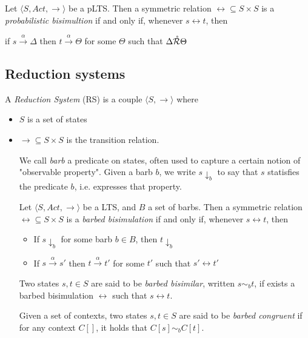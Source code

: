 Let $\langle S , Act, \rightarrow \rangle$ be a pLTS. Then a symmetric relation $\rel \subseteq S \times S$ is a \textit{probabilistic bisimultion} if and only if, whenever $s \rel t$, then 
\begin{center}
if $s \xrightarrow{\alpha} \Delta$ then $t \xrightarrow{\alpha} \Theta$ for some $\Theta$ such that $\Delta \mathring{\mathcal{R}} \Theta$
\end{center}

\subsection*{Reduction systems}

A \textit{Reduction System} (RS) is a couple $\langle S,  \rightarrow \rangle$ where \begin{itemize}
\item $S$ is a set of states
\item $\rightarrow 	\subseteq S\times S$ is the transition relation.

We call \textit{barb} a predicate on states, often used to capture a certain notion of "observable property".
Given a barb $b$, we write $s\downarrow_b$ to say that $s$ statisfies the predicate $b$, i.e. expresses that property.

Let $\langle S , Act, \rightarrow \rangle$ be a LTS, and $B$ a set of barbs. Then a symmetric relation $\rel \subseteq S \times S$ is a \textit{barbed bisimulation} if and only if, whenever $s \rel t$, then 
\begin{itemize}
\item If $s \downarrow_b$ for some barb $b \in B$, then $t \downarrow_b$ \\
\item If $s \xrightarrow{\alpha} s'$ then $t \xrightarrow{\alpha} t'$ for some $t'$ such that $s' \rel t'$
\end{itemize}
Two states $s, t \in S$ are said to be \textit{barbed bisimilar}, written $s \sim_b t$, if exists a barbed bisimulation $\rel$ such that $s \rel t$.

Given a set of contexts, two states $s, t \in S$ are said to be \textit{barbed congruent} if for any context $C[]$, it holds that $C[s] \sim_b C[t]$. 

\end{itemize} 
